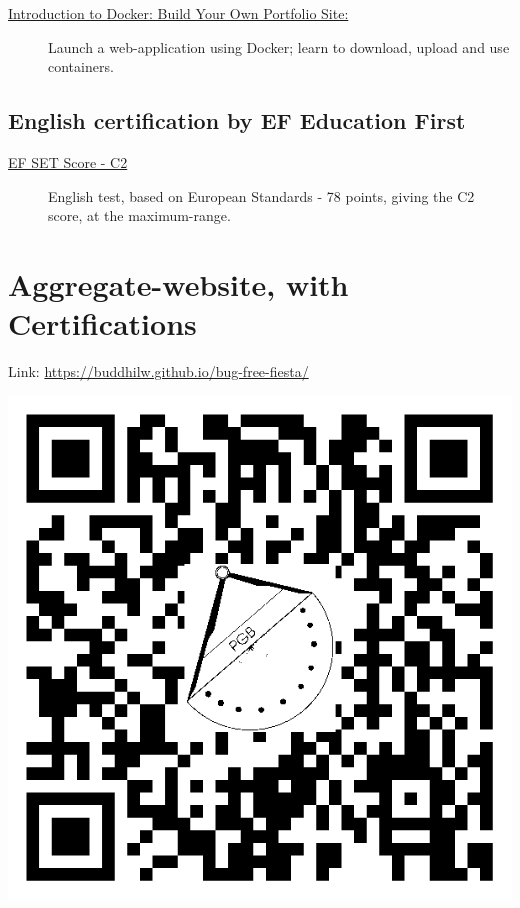 \documentclass[letterpaper]{../cls/twentysecondcvenglish} %
\begin{document}
\begin{description}
\item[\href{https://buddhilw.github.io/bug-free-fiesta/}{Introduction to Docker: Build Your Own Portfolio Site:}] Launch a web-application using Docker; learn to download, upload and use containers.
\end{description}

\vspace{10mm}
\subsection{\textbf{English certification by EF Education First}}

\begin{description}
\item[\href{https://buddhilw.github.io/bug-free-fiesta/}{EF SET Score - C2}] English test, based on European Standards - 78 points, giving the C2 score, at the maximum-range.
\end{description}


\vspace{5mm}
\section{Aggregate-website, with Certifications}

\vspace{1mm}

\begin{center}
  Link: \href{https://buddhilw.github.io/bug-free-fiesta/}{https://buddhilw.github.io/bug-free-fiesta/}
\vspace{1mm}

\includegraphics[width=\imagewidth]{../img/virtcerts.png}
\end{center}
\newpage
\makeprofileNoExtra
\end{document}
